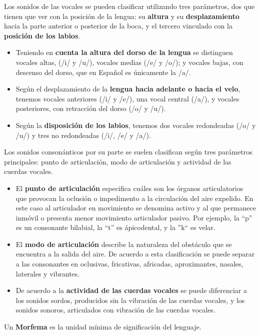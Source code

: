 Los sonidos de las vocales se pueden clasificar utilizando tres parámetros, dos que tienen que ver con la posición de la lengua: su \textbf{altura} y su \textbf{desplazamiento} hacia la parte anterior o posterior de la boca, y el tercero vinculado con la \textbf{posición de los labios}.
\begin{itemize}
\item Teniendo en \textbf{cuenta la altura del dorso de la lengua} se distinguen vocales altas, (/i/ y /u/), vocales medias (/e/ y /o/); y vocales bajas, con descenso del dorso, que en Español es únicamente la /a/.
\item Según el desplazamiento de la \textbf{lengua hacia adelante o hacia el velo}, tenemos vocales anteriores (/i/ y /e/), una vocal central (/a/), y vocales posteriores, con retracción del dorso (/o/ y /u/).
\item Según  la \textbf{disposición de los labios}, tenemos
dos vocales redondeadas (/o/ y /u/) y tres no redondeadas (/i/, /e/ y /a/).
\end{itemize}
Los sonidos consonánticos por su parte se suelen clasifican según tres parámetros principales: punto de articulación, modo de
articulación y actividad de las cuerdas vocales.

\begin{itemize}
\item El \textbf{punto de articulación} especifica cuáles son los órganos articulatorios que provocan la oclusión o impedimento a la circulación
del aire expelido. En este caso al articulador en movimiento se
denomina activo y al que permanece inmóvil o presenta menor
movimiento articulador pasivo. Por ejemplo, la “p” es un consonante bilabial, la “t” es ápicodental, y la ”k“ es velar.

\item El \textbf{modo de articulación} describe la naturaleza del obstáculo que se encuentra a la salida del aire. De acuerdo a esta clasificación se puede separar a las consonantes en oclusivas, fricativas, africadas, aproximantes, nasales, laterales y vibrantes.
\item De acuerdo a la \textbf{actividad de las cuerdas vocales} se puede diferenciar a los sonidos sordos, producidos sin la vibración de las
cuerdas vocales, y los sonidos sonoros, articulados con vibración
de las cuerdas vocales.\\
\end{itemize}
  

\begin{defn}
Un \textbf{Morfema} es la unidad mínima de significación del lenguaje.
\end{defn}

